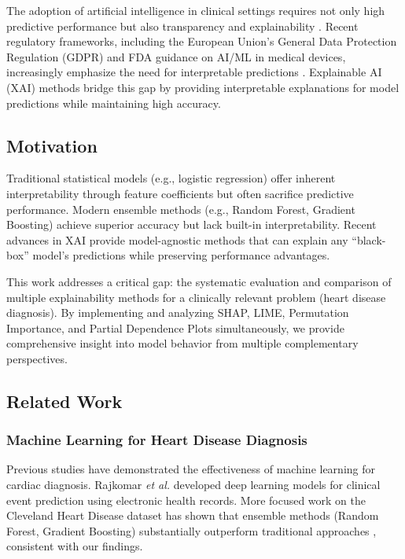\documentclass[journal]{IEEEtran}
\begin{document}
The adoption of artificial intelligence in clinical settings requires not only high predictive performance but also transparency and explainability \cite{ronco2021machine}. Recent regulatory frameworks, including the European Union's General Data Protection Regulation (GDPR) and FDA guidance on AI/ML in medical devices, increasingly emphasize the need for interpretable predictions \cite{amoore2018ai}. Explainable AI (XAI) methods bridge this gap by providing interpretable explanations for model predictions while maintaining high accuracy.

\subsection{Motivation}

Traditional statistical models (e.g., logistic regression) offer inherent interpretability through feature coefficients but often sacrifice predictive performance. Modern ensemble methods (e.g., Random Forest, Gradient Boosting) achieve superior accuracy but lack built-in interpretability. Recent advances in XAI provide model-agnostic methods that can explain any ``black-box'' model's predictions while preserving performance advantages.

This work addresses a critical gap: the systematic evaluation and comparison of multiple explainability methods for a clinically relevant problem (heart disease diagnosis). By implementing and analyzing SHAP, LIME, Permutation Importance, and Partial Dependence Plots simultaneously, we provide comprehensive insight into model behavior from multiple complementary perspectives.

\subsection{Related Work}

\subsubsection{Machine Learning for Heart Disease Diagnosis}
Previous studies have demonstrated the effectiveness of machine learning for cardiac diagnosis. Rajkomar \textit{et al.} \cite{rajkomar2018scalable} developed deep learning models for clinical event prediction using electronic health records. More focused work on the Cleveland Heart Disease dataset has shown that ensemble methods (Random Forest, Gradient Boosting) substantially outperform traditional approaches \cite{breiman2001random}, consistent with our findings.
\end{document}
